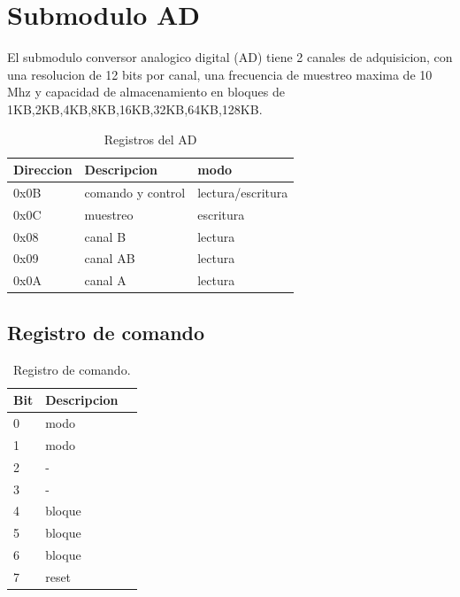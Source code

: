 \section{Submodulo AD}

El submodulo conversor analogico digital (AD) tiene 2 canales de adquisicion,
con una resolucion de 12 bits por canal, una frecuencia de muestreo maxima de 10 Mhz 
y capacidad de almacenamiento en bloques de 1KB,2KB,4KB,8KB,16KB,32KB,64KB,128KB.

\begin{table}[ht]
    \centering
    \begin{tabular}{|l|l|l|}
    \hline
     Direccion   & Descripcion       & modo\\
    \hline
     0x0B        & comando y control & lectura/escritura\\ 
    \hline
     0x0C        & muestreo          & escritura\\
     \hline
     0x08        & canal B           &lectura   \\
     \hline
     0x09        & canal AB          &lectura   \\
     \hline
     0x0A        & canal A           &lectura   \\
     \hline
\end{tabular}
\caption{\label{tab:registros_ad} Registros del AD}
\end{table}

\subsection{Registro de comando}
\begin{table}[ht]
    \centering
    \begin{tabular}{|l|l|l|}
    \hline
    Bit    & Descripcion \\
    \hline
     0 & modo\\ 
    \hline
     1 & modo\\
     \hline
     2 & - \\
     \hline
     3 & - \\
     \hline
     4 & bloque \\
     \hline
     5 & bloque \\
     \hline
     6 & bloque \\
     \hline
     7 & reset \\
     \hline
\end{tabular}
\caption{\label{tab:registros_ad_cmd}Registro de comando.}
\end{table}

